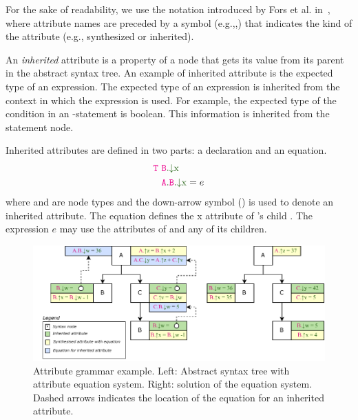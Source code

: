 For the sake of readability, we use the notation introduced by Fors et al. in~\cite{fors2020patterns},
where attribute names are preceded by a symbol (e.g.,\textcolor{ATGsym}{\mSyn{}},\textcolor{ATGsym}{\mInh{}})
that indicates the kind of the attribute (e.g., synthesized or inherited).

An \emph{inherited} attribute is a property of a node that gets its value from
its parent in the abstract syntax tree.
An example of inherited attribute is the expected type of an expression.
The expected type of an expression is inherited from the context in which the expression is used.
For example, the expected type of the condition in an -statement is boolean.
This information is inherited from the  statement node.

Inherited attributes are defined in two parts: a declaration and an equation.
\begin{align*}
 \astnode{T} \ &\Ainh{B}{x} \\
 &\Ainhdef{A}{B}{x} = e
\end{align*}
where  and  are node types and the down-arrow symbol (\textcolor{ATGsym}{\mInh{}}) is used to denote an inherited attribute.
The equation defines the \textcolor{ATGsym}{x} attribute of 's child .
The expression $e$ may use the attributes of  and any of its children.


\begin{figure}
\centering
\includegraphics[width=1\textwidth]{kappa/img/AGExample.pdf}
    \caption{\label{fig:ragsExample} Attribute grammar example.
    Left: Abstract syntax tree with attribute equation system. Right: solution of the equation system.
    Dashed arrows indicates the location of the equation for an inherited attribute.
    }
\end{figure}

